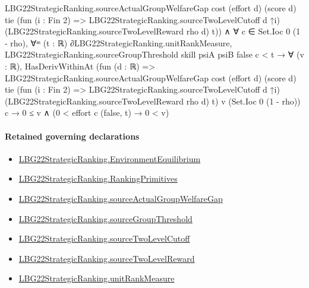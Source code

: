 \documentclass[10pt]{article}
\begin{document}
\begin{ReviewVerbatim}
                                          LBG22StrategicRanking.sourceActualGroupWelfareGap cost (effort d) (score d)
                                            tie (fun (i : Fin 2) => LBG22StrategicRanking.sourceTwoLevelCutoff d ↑i)
                                            (LBG22StrategicRanking.sourceTwoLevelReward rho d) t)) ∧
                        ∀ c ∈ Set.Ioc 0 (1 - rho),
                          ∀ᵐ (t : ℝ) ∂LBG22StrategicRanking.unitRankMeasure,
                            LBG22StrategicRanking.sourceGroupThreshold skill psiA psiB false c < t →
                              ∀ (v : ℝ),
                                HasDerivWithinAt
                                    (fun (d : ℝ) =>
                                      LBG22StrategicRanking.sourceActualGroupWelfareGap cost (effort d) (score d) tie
                                        (fun (i : Fin 2) => LBG22StrategicRanking.sourceTwoLevelCutoff d ↑i)
                                        (LBG22StrategicRanking.sourceTwoLevelReward rho d) t)
                                    v (Set.Ioc 0 (1 - rho)) c →
                                  0 ≤ v ∧ (0 < effort c (false, t) → 0 < v)
\end{ReviewVerbatim}

\paragraph{Retained governing declarations}
\begin{itemize}\raggedright
\item \hyperlink{paper-prerequisite-b8e06f39e94d0049}{LBG22\allowbreak{}Strategic\allowbreak{}Ranking.\allowbreak{}Environment\allowbreak{}Equilibrium}
\item \hyperlink{paper-prerequisite-9bbcc12f4a1736bf}{LBG22\allowbreak{}Strategic\allowbreak{}Ranking.\allowbreak{}Ranking\allowbreak{}Primitives}
\item \hyperlink{paper-prerequisite-d3e90f3908818ca5}{LBG22\allowbreak{}Strategic\allowbreak{}Ranking.\allowbreak{}source\allowbreak{}Actual\allowbreak{}Group\allowbreak{}Welfare\allowbreak{}Gap}
\item \hyperlink{paper-prerequisite-b2f8283910c81320}{LBG22\allowbreak{}Strategic\allowbreak{}Ranking.\allowbreak{}source\allowbreak{}Group\allowbreak{}Threshold}
\item \hyperlink{paper-prerequisite-f88aac58507e44ca}{LBG22\allowbreak{}Strategic\allowbreak{}Ranking.\allowbreak{}source\allowbreak{}Two\allowbreak{}Level\allowbreak{}Cutoff}
\item \hyperlink{paper-prerequisite-30d97cd43eb79017}{LBG22\allowbreak{}Strategic\allowbreak{}Ranking.\allowbreak{}source\allowbreak{}Two\allowbreak{}Level\allowbreak{}Reward}
\item \hyperlink{governing-declaration-678cf48d549cb620}{LBG22\allowbreak{}Strategic\allowbreak{}Ranking.\allowbreak{}unit\allowbreak{}Rank\allowbreak{}Measure}
\end{itemize}
\end{document}
